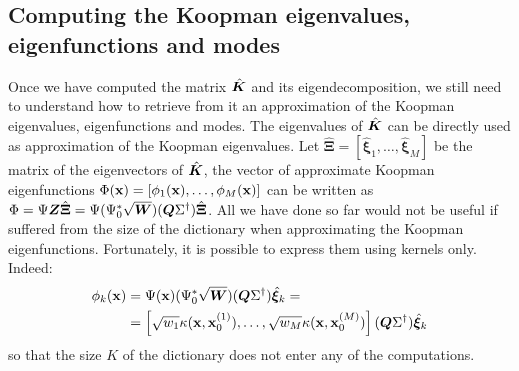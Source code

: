 \subsection{Computing the Koopman eigenvalues, eigenfunctions and modes}
Once we have computed the matrix $\hat{\vb*{K}}$ and its eigendecomposition, we still need to understand how to retrieve from it an approximation of the Koopman eigenvalues, eigenfunctions and modes. The eigenvalues of $\hat{\vb*{K}}$ can be directly used as approximation of the Koopman eigenvalues. Let $\hat{\bm{\Xi}} = \left[\hat{\bm{\xi}}_1,\dots,\hat{\bm{\xi}}_M\right]$ be the matrix of the eigenvectors of $\hat{\vb*{K}}$, the vector of approximate Koopman eigenfunctions $\Phi(\vb{x}) = \left[\phi_1(\vb{x}), \dots, \phi_M(\vb{x})\right]$ can be written as $\Phi = \Psi\vb*{Z}\hat{\bm{\Xi}} = \Psi (\Psi_0^*\sqrt{\vb*{W}})(\vb*{Q}\Sigma^{\dagger}) \hat{\bm{\Xi}}$. All we have done so far would not be useful if suffered from the size of the dictionary when approximating the Koopman eigenfunctions. Fortunately, it is possible to express them using kernels only. Indeed:
\begin{equation}
    \label{kernel_eigenfunctions}
    \begin{split}
        \phi_k(\vb{x}) &= \Psi(\vb{x}) (\Psi_0^*\sqrt{\vb*{W}})(\vb*{Q}\Sigma^{\dagger}) \hat{\bm{\xi}}_k =\\
        &= \left[\sqrt{w_1} \kappa(\vb{x}, \vb{x}_0^{(1)}), \dots, \sqrt{w_M} \kappa(\vb{x}, \vb{x}_0^{(M)})\right](\vb*{Q}\Sigma^{\dagger}) \hat{\bm{\xi}}_k
    \end{split}
\end{equation}
so that the size $K$ of the dictionary does not enter any of the computations.

